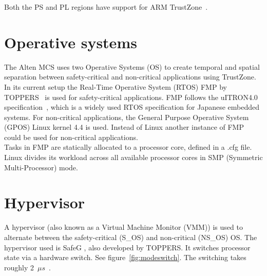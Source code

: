 Both the PS and PL regions have support for ARM TrustZone~\cite{website:ARM}.

\section{Operative systems}
The Alten MCS uses two Operative Systems (OS) to create temporal and spatial separation between safety-critical and non-critical applications using TrustZone. In its current setup the Real-Time Operative System (RTOS) FMP by TOPPERS~\cite{website:fmp} is used for safety-critical applications. FMP follows the uITRON4.0 specification~\cite{uitron}, which is a widely used RTOS specification for Japanese embedded systems. For non-critical applications, the General Purpose Operative System (GPOS) Linux kernel 4.4 is used. Instead of Linux another instance of FMP could be used for non-critical applications.\\

Tasks in FMP are statically allocated to a processor core, defined in a .cfg file. Linux divides its workload across all available processor cores in SMP (Symmetric Multi-Processor) mode.

\section{Hypervisor}

A hypervisor (also known as a Virtual Machine Monitor (VMM)) is used to alternate between the safety-critical (S\_OS) and non-critical (NS\_OS) OS. The hypervisor used is SafeG \cite{website:safeg}, also developed by TOPPERS. It switches processor state via a hardware switch. See figure~\ref{fig:modeswitch}. The switching takes roughly 2~$\mu s$~\cite{safegswitch}.

